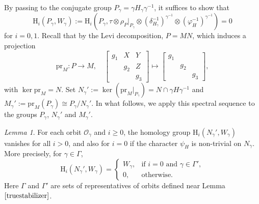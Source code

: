 \documentclass[12pt]{amsart}
\newcommand{\RH}{{\mathrm {H}}}
\theoremstyle{Theorem}
\theoremstyle{Theorem}
\theoremstyle{Theorem}
\theoremstyle{Theorem}
\theoremstyle{Plain}
\theoremstyle{remark}
\theoremstyle{remark}
\theoremstyle{Definition}
\newtheorem{lemd}[dfn]{Lemma}
\begin{document}
By passing to the conjugate group $ P_\gamma = \gamma H_\gamma \gamma^{-1} $, it suffices to show that
\[
    \RH_i ( P_\gamma, W_\gamma ) := \RH_i 
    \left(
        P_\gamma, \tau \otimes \rho_P|_{ P_\gamma } \otimes { \left( \delta_{ H_\gamma }^{-1} \right) }^{ \gamma^{-1} } \otimes \left( \varphi_H^{-1} \right)^{ \gamma^{-1} }
    \right)
    =0
\]
for $ i = 0, 1 $. Recall that by the Levi decomposition, $ P = MN $, which induces a projection
\[
    \mathrm{pr}_M: P \rightarrow M, \quad
    \begin{bmatrix}
        g_1 & X   & Y  \\
            & g_2 & Z  \\
            &     & g_3
    \end{bmatrix}
    \mapsto
    \begin{bmatrix}
        g_1 &     &    \\
            & g_2 &    \\
            &     & g_3
    \end{bmatrix}
    ,
\]
with $ \ker \mathrm{pr}_M = N $. Set $ N_\gamma' := \ker( \mathrm{pr}_M|_{ P_\gamma } ) = N \cap \gamma H \gamma^{-1} $ and $ M_\gamma' := \mathrm{pr}_M ( P_\gamma ) \cong P_\gamma / N_\gamma' $. In what follows, we apply this spectral sequence to the groups $P_{\gamma}$, $N_\gamma'$ and $M_\gamma'$. 

\begin{lemd}
    For each orbit $ \mathcal{O}_\gamma $ and $ i \ge 0 $, the homology group $ \RH_i \left( N_\gamma', W_\gamma \right) $ vanishes for all $ i > 0 $, and also for $ i = 0 $ if the character $\psi_H$ is non-trivial on $N_\gamma$. More precisely, for $ \gamma \in \Gamma $,
    \[
        \RH_i \left( N_\gamma', W_\gamma \right) =
        \begin{cases}
            W_\gamma, & \text{if } i = 0 \text{ and } \gamma \in \Gamma',\\
            0,        & \text{otherwise}.
    \end{cases}
    \]
    Here $\Gamma$ and $\Gamma'$ are sets of representatives of orbits defined near Lemma $ \ref{truestabilizer} $.
\end{lemd}
\end{document}
